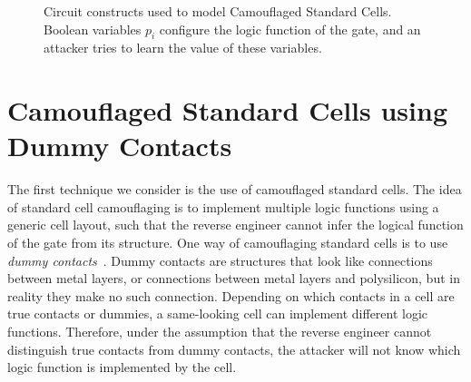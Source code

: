 \documentclass[proposal]{umassthesis}  %
\begin{document}
  \begin{figure}[!ht]
  \centering
    \caption{Circuit constructs used to model Camouflaged Standard Cells. Boolean variables $p_i$ configure the logic function of the gate, and an attacker tries to learn the value of these variables.}
    \label{fig:select}
  \end{figure}























\section{Camouflaged Standard Cells using Dummy Contacts}
The first technique we consider is the use of camouflaged standard cells. The idea of standard cell camouflaging is to implement multiple logic functions using a generic cell layout, such that the reverse engineer cannot infer the logical function of the gate from its structure. One way of camouflaging standard cells is to use \textit{dummy contacts}~\cite{chow-2007-integrated}. Dummy contacts are structures that look like connections between metal layers, or connections between metal layers and polysilicon, but in reality they make no such connection. Depending on which contacts in a cell are true contacts or dummies, a same-looking cell can implement different logic functions. Therefore, under the assumption that the reverse engineer cannot distinguish true contacts from dummy contacts, the attacker will not know which logic function is implemented by the cell.
\end{document}
